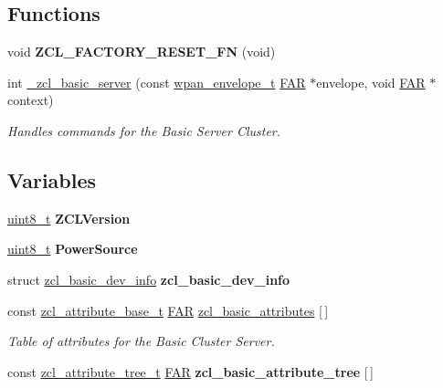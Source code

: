 \subsection*{Functions}
\begin{DoxyCompactItemize}
\item 
\hypertarget{group__zcl__basic_ga05d8ea20bcda8b14959cc1231d995471}{void {\bfseries Z\-C\-L\-\_\-\-F\-A\-C\-T\-O\-R\-Y\-\_\-\-R\-E\-S\-E\-T\-\_\-\-F\-N} (void)}\label{group__zcl__basic_ga05d8ea20bcda8b14959cc1231d995471}

\item 
int \hyperlink{group__zcl__basic_ga3a10395a400ea91bf9a3c37dcda69085}{\-\_\-zcl\-\_\-basic\-\_\-server} (const \hyperlink{structwpan__envelope__t}{wpan\-\_\-envelope\-\_\-t} \hyperlink{group__hal_gaef060b3456fdcc093a7210a762d5f2ed}{F\-A\-R} $\ast$envelope, void \hyperlink{group__hal_gaef060b3456fdcc093a7210a762d5f2ed}{F\-A\-R} $\ast$context)
\begin{DoxyCompactList}\small\item\em Handles commands for the Basic Server Cluster. \end{DoxyCompactList}\end{DoxyCompactItemize}
\subsection*{Variables}
\begin{DoxyCompactItemize}
\item 
\hypertarget{group__zcl__basic_ga192f747f17a619e344287c3e7f8a0dca}{\hyperlink{group__hal_gae1affc9ca37cfb624959c866a73f83c2}{uint8\-\_\-t} {\bfseries Z\-C\-L\-Version}}\label{group__zcl__basic_ga192f747f17a619e344287c3e7f8a0dca}

\item 
\hypertarget{group__zcl__basic_ga339efb8b2f6c1ed9a5269621bc7adfbb}{\hyperlink{group__hal_gae1affc9ca37cfb624959c866a73f83c2}{uint8\-\_\-t} {\bfseries Power\-Source}}\label{group__zcl__basic_ga339efb8b2f6c1ed9a5269621bc7adfbb}

\item 
struct \hyperlink{structzcl__basic__dev__info}{zcl\-\_\-basic\-\_\-dev\-\_\-info} {\bfseries zcl\-\_\-basic\-\_\-dev\-\_\-info}
\item 
\hypertarget{group__zcl__basic_ga721ebe2f6ae346632475cf178671d150}{const \hyperlink{structzcl__attribute__base__t}{zcl\-\_\-attribute\-\_\-base\-\_\-t} \hyperlink{group__hal_gaef060b3456fdcc093a7210a762d5f2ed}{F\-A\-R} \hyperlink{group__zcl__basic_ga721ebe2f6ae346632475cf178671d150}{zcl\-\_\-basic\-\_\-attributes} \mbox{[}$\,$\mbox{]}}\label{group__zcl__basic_ga721ebe2f6ae346632475cf178671d150}

\begin{DoxyCompactList}\small\item\em Table of attributes for the Basic Cluster Server. \end{DoxyCompactList}\item 
const \hyperlink{structzcl__attribute__tree__t}{zcl\-\_\-attribute\-\_\-tree\-\_\-t} \hyperlink{group__hal_gaef060b3456fdcc093a7210a762d5f2ed}{F\-A\-R} {\bfseries zcl\-\_\-basic\-\_\-attribute\-\_\-tree} \mbox{[}$\,$\mbox{]}
\end{DoxyCompactItemize}
